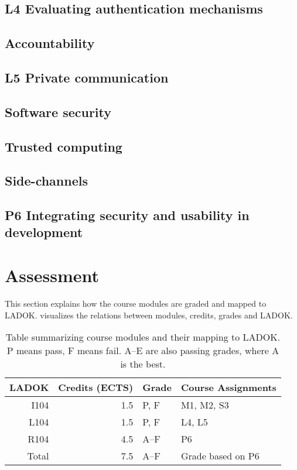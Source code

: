 \subsection{L4 Evaluating authentication mechanisms}


\subsection{Accountability}


\subsection{L5 Private communication}


\subsection{Software security}


\subsection{Trusted computing}


\subsection{Side-channels}


\subsection{P6 Integrating security and usability in development}



\section{Assessment}
\label{Assessment}

This section explains how the course modules are graded and mapped to LADOK\@.
 visualizes the relations between modules, credits, grades and 
LADOK\@.

\begin{table}
  \centering
  \caption{%
    Table summarizing course modules and their mapping to LADOK\@.
    P means pass, F means fail.
    A--E are also passing grades, where A is the best.
  }\label{LADOKTable}
  \begin{tabular}{rrll}
    \toprule
    LADOK & Credits (ECTS)  & Grade       & Course Assignments\\
    \midrule
    I104  & 1.5             & P, F        & M1, M2, S3\\
    L104  & 1.5             & P, F        & L4, L5\\
    R104  & 4.5             & A--F        & P6\\
    \midrule
    Total & 7.5             & A--F        & Grade based on P6\\
    \bottomrule
  \end{tabular}
\end{table}

